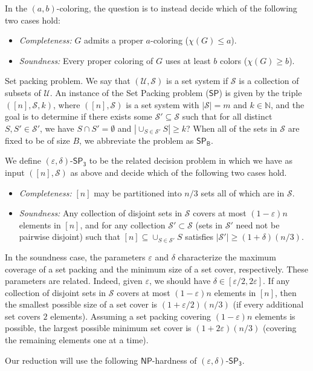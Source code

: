 \documentclass{article}\providecommand{\DeclareRedundantLanguages}[2]{}\usepackage[a4paper,margin=20mm]{geometry}
\newcommand{\1}{\textbf{1}}
\newcommand{\setp}{$\mathsf{SP}$\xspace}
\newcommand{\setpT}{$\mathsf{SP_3}$\xspace}
\newcommand{\setpB}{$\mathsf{SP_B}$\xspace}
\newcommand{\np}{$\mathsf{NP}$\xspace}
\begin{document}
In the $(a, b)$-coloring, the question is to instead decide which of the following two cases hold:
\begin{itemize}
    \item \textit{Completeness:} $G$ admits a proper $a$-coloring ($\chi(G) \leq a$).
    \item \textit{Soundness:} Every proper coloring of $G$ uses at least $b$ colors  ($\chi(G) \geq b$).
\end{itemize}

\begin{paragraph}{Set packing problem.}
We say that $(\mathcal{U}, \mathcal{S})$ is a set system if $\mathcal{S}$ is a collection of subsets of $\mathcal{U}$.
An instance of the Set Packing problem (\setp) is given by the triple $([n], \mathcal{S}, k)$, where $([n], \mathcal{S})$ is a set system with $|\mathcal{S}| = m$ and $k \in \mathbb{N}$, and the goal is to determine if there exists some $\mathcal{S}' \subseteq \mathcal{S}$ such that for all distinct $S, S' \in \mathcal{S}'$, we have $S \cap S' = \emptyset$ and   $|\cup_{S \in \mathcal{S}'} S| \geq k$? When all of the sets in $\mathcal{S}$ are fixed to be of size $B$, we abbreviate the problem as \setpB. 

We define $(\varepsilon, \delta)$-\setpT to be the related decision problem in which we have as input $([n], \mathcal{S})$ as above and decide which of the following two cases hold.
\begin{itemize}
    \item \textit{Completeness:} $[n]$ may be partitioned into $n/3$ sets all of which are in $\mathcal{S}$.
    \item \textit{Soundness:} Any collection of disjoint sets in $\mathcal{S}$ covers at most $(1-\varepsilon)n$ elements in $[n]$, and for any collection $\mathcal{S}' \subset \mathcal{S}$ (sets in $\mathcal{S}'$ need not be pairwise disjoint) such that $[n] \subseteq \cup_{S \in \mathcal{S}'} S$ satisfies $|\mathcal{S}'| \geq (1 + \delta)(n/3)$.
\end{itemize}


\begin{remark}In the soundness case, the parameters $\varepsilon$ and $\delta$ characterize the maximum coverage of a set packing and the minimum size of a set cover, respectively. These parameters are related. Indeed, given $\varepsilon$, we should have $\delta \in [\varepsilon/2, 2\varepsilon]$. If any collection of disjoint sets in $\mathcal{S}$ covers at most $(1-\varepsilon)n$ elements in $[n]$, then the smallest possible size of a set cover is $(1 + \varepsilon/2)(n/3)$ (if every additional set covers $2$ elements). Assuming a set packing covering $(1-\varepsilon)n$ elements is possible, the largest possible minimum set cover is $(1 + 2\varepsilon)(n/3)$ (covering the remaining elements one at a time).  \label{rem:epsdelta}\end{remark}
Our reduction will use the following \np-hardness of $(\varepsilon, \delta)$-\setpT. 



\end{paragraph}
\end{document}
